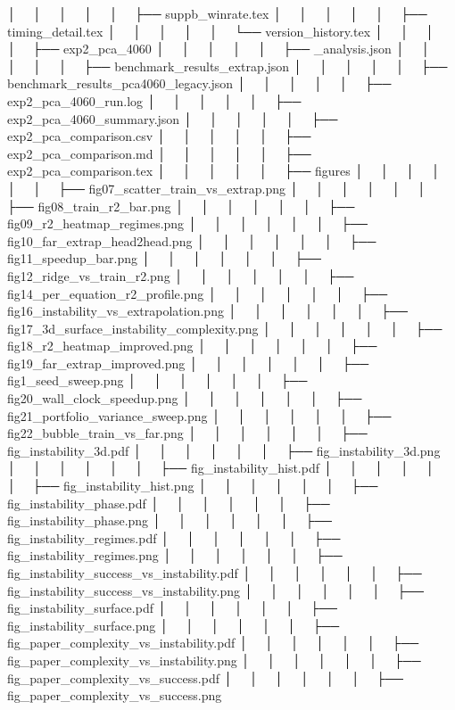 │   │       │   │   │       ├── suppb_winrate.tex
│   │       │   │   │       ├── timing_detail.tex
│   │       │   │   │       └── version_history.tex
│   │       │   │   ├── exp2_pca_4060
│   │       │   │   │   ├── _analysis.json
│   │       │   │   │   ├── benchmark_results_extrap.json
│   │       │   │   │   ├── benchmark_results_pca4060_legacy.json
│   │       │   │   │   ├── exp2_pca_4060_run.log
│   │       │   │   │   ├── exp2_pca_4060_summary.json
│   │       │   │   │   ├── exp2_pca_comparison.csv
│   │       │   │   │   ├── exp2_pca_comparison.md
│   │       │   │   │   ├── exp2_pca_comparison.tex
│   │       │   │   │   ├── figures
│   │       │   │   │   │   ├── fig07_scatter_train_vs_extrap.png
│   │       │   │   │   │   ├── fig08_train_r2_bar.png
│   │       │   │   │   │   ├── fig09_r2_heatmap_regimes.png
│   │       │   │   │   │   ├── fig10_far_extrap_head2head.png
│   │       │   │   │   │   ├── fig11_speedup_bar.png
│   │       │   │   │   │   ├── fig12_ridge_vs_train_r2.png
│   │       │   │   │   │   ├── fig14_per_equation_r2_profile.png
│   │       │   │   │   │   ├── fig16_instability_vs_extrapolation.png
│   │       │   │   │   │   ├── fig17_3d_surface_instability_complexity.png
│   │       │   │   │   │   ├── fig18_r2_heatmap_improved.png
│   │       │   │   │   │   ├── fig19_far_extrap_improved.png
│   │       │   │   │   │   ├── fig1_seed_sweep.png
│   │       │   │   │   │   ├── fig20_wall_clock_speedup.png
│   │       │   │   │   │   ├── fig21_portfolio_variance_sweep.png
│   │       │   │   │   │   ├── fig22_bubble_train_vs_far.png
│   │       │   │   │   │   ├── fig_instability_3d.pdf
│   │       │   │   │   │   ├── fig_instability_3d.png
│   │       │   │   │   │   ├── fig_instability_hist.pdf
│   │       │   │   │   │   ├── fig_instability_hist.png
│   │       │   │   │   │   ├── fig_instability_phase.pdf
│   │       │   │   │   │   ├── fig_instability_phase.png
│   │       │   │   │   │   ├── fig_instability_regimes.pdf
│   │       │   │   │   │   ├── fig_instability_regimes.png
│   │       │   │   │   │   ├── fig_instability_success_vs_instability.pdf
│   │       │   │   │   │   ├── fig_instability_success_vs_instability.png
│   │       │   │   │   │   ├── fig_instability_surface.pdf
│   │       │   │   │   │   ├── fig_instability_surface.png
│   │       │   │   │   │   ├── fig_paper_complexity_vs_instability.pdf
│   │       │   │   │   │   ├── fig_paper_complexity_vs_instability.png
│   │       │   │   │   │   ├── fig_paper_complexity_vs_success.pdf
│   │       │   │   │   │   ├── fig_paper_complexity_vs_success.png
